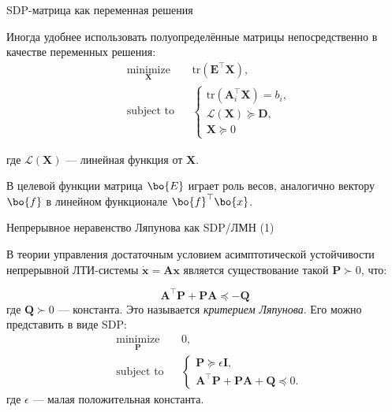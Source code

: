 \documentclass{beamer}
\begin{document}
\begin{frame}{SDP-матрица как переменная решения}
	\begin{flushleft}
		
		Иногда удобнее использовать полуопределённые матрицы непосредственно в качестве переменных решения:
		\begin{equation}
			\begin{aligned}
				& \underset{\mathbf{X}}{\text{minimize}}
				& & \text{tr}(\mathbf{E}^\top \mathbf{X}), \\
				& \text{subject to}
				& & \begin{cases}
					\text{tr}(\mathbf{A}_i^\top\mathbf{X}) = b_i, \\
					\mathcal{L}(\mathbf{X}) \succeq \mathbf{D}, \\
					\mathbf{X} \succeq 0
				\end{cases}
			\end{aligned}
		\end{equation}
		
		где $ \mathcal{L}(\mathbf{X})$ — линейная функция от $\mathbf{X}$.
		
		\bigskip
		
		В целевой функции матрица $\bo{E}$ играет роль весов, аналогично вектору $\bo{f}$ в линейном функционале $\bo{f}^\top \bo{x}$. 
		
	\end{flushleft}
\end{frame}




\begin{frame}{Непрерывное неравенство Ляпунова как SDP/ЛМН (1)}
	\begin{flushleft}
		
		В теории управления достаточным условием асимптотической устойчивости непрерывной ЛТИ-системы $\dot{\mathbf{x}} = \mathbf{A}\mathbf{x}$ является существование такой $\mathbf{P} \succ 0$, что:
		
		\begin{equation}
			\mathbf{A}^\top\mathbf{P} + \mathbf{P}\mathbf{A}  \preceq -\mathbf{Q}
		\end{equation}
		где $\mathbf{Q} \succ 0$ — константа. Это называется \emph{критерием Ляпунова}. Его можно представить в виде SDP:
		\begin{equation}
			\begin{aligned}
				& \underset{\mathbf{P}}{\text{minimize}}
				& & 0, \\
				& \text{subject to}
				& & \begin{cases}
					\mathbf{P} \succeq \epsilon \mathbf{I}, \\
					\mathbf{A}^\top\mathbf{P} + \mathbf{P}\mathbf{A} + \mathbf{Q} \preceq 0.
				\end{cases}
			\end{aligned}
		\end{equation}
		где $\epsilon$ — малая положительная константа.
		
	\end{flushleft}
\end{frame}
\end{document}
